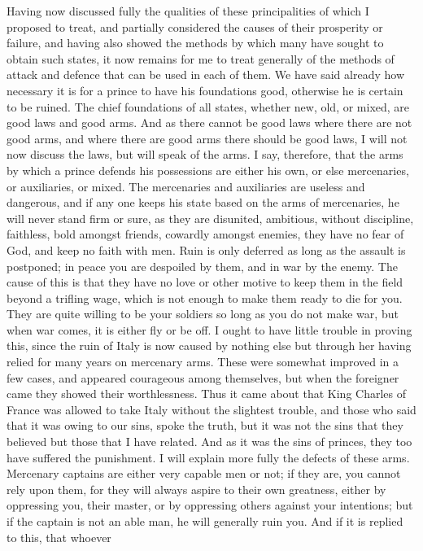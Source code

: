 \documentclass[12pt,letterpaper]{memoir}
\begin{document}
Having now discussed fully the qualities of these principalities of
which I proposed to treat, and partially considered the causes of their
prosperity or failure, and having also showed the methods by which
many have sought to obtain such states, it now remains for me to treat
generally of the methods of attack and defence that can be used in
each of them. We have said already how necessary it is for a prince
to have his foundations good, otherwise he is certain to be ruined.
The chief foundations of all states, whether new, old, or mixed, are
good laws and good arms. And as there cannot be good laws where there
are not good arms, and where there are good arms there should be good
laws, I will not now discuss the laws, but will speak of the arms. I
say, therefore, that the arms by which a prince defends his possessions
are either his own, or else mercenaries, or auxiliaries, or mixed. The
mercenaries and auxiliaries are useless and dangerous, and if any one
keeps his state based on the arms of mercenaries, he will never stand
firm or sure, as they are disunited, ambitious, without discipline,
faithless, bold amongst friends, cowardly amongst enemies, they have no
fear of God, and keep no faith with men. Ruin is only deferred as long
as the assault is postponed; in peace you are despoiled by them, and in
war by the enemy. The cause of this is that they have no love or other
motive to keep them in the field beyond a trifling wage, which is not
enough to make them ready to die for you. They are quite willing to be
your soldiers so long as you do not make war, but when war comes, it is
either fly or be off. I ought to have little trouble in proving this,
since the ruin of Italy is now caused by nothing else but through her
having relied for many years on mercenary arms. These were somewhat
improved in a few cases, and appeared courageous among themselves, but
when the foreigner came they showed their worthlessness. Thus it came
about that King Charles of France was allowed to take Italy without the
slightest trouble, and those who said that it was owing to our sins,
spoke the truth, but it was not the sins that they believed but those
that I have related. And as it was the sins of princes, they too have
suffered the punishment. I will explain more fully the defects of these
arms. Mercenary captains are either very capable men or not; if they
are, you cannot rely upon them, for they will always aspire to their
own greatness, either by oppressing you, their master, or by oppressing
others against your intentions; but if the captain is not an able man,
he will generally ruin you. And if it is replied to this, that whoever
\end{document}
